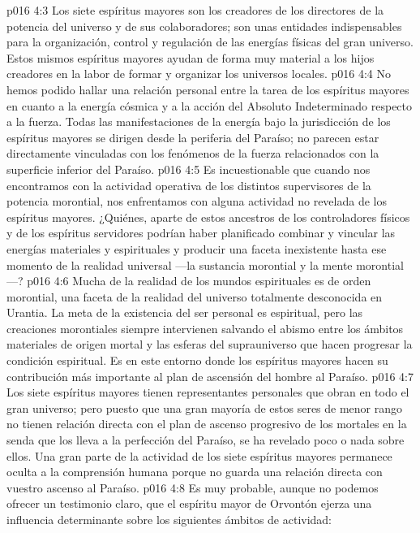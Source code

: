 \vs p016 4:3 Los siete espíritus mayores son los creadores de los directores de la potencia del universo y de sus colaboradores; son unas entidades indispensables para la organización, control y regulación de las energías físicas del gran universo. Estos mismos espíritus mayores ayudan de forma muy material a los hijos creadores en la labor de formar y organizar los universos locales.
\vs p016 4:4 No hemos podido hallar una relación personal entre la tarea de los espíritus mayores en cuanto a la energía cósmica y a la acción del Absoluto Indeterminado respecto a la fuerza. Todas las manifestaciones de la energía bajo la jurisdicción de los espíritus mayores se dirigen desde la periferia del Paraíso; no parecen estar directamente vinculadas con los fenómenos de la fuerza relacionados con la superficie inferior del Paraíso.
\vs p016 4:5 Es incuestionable que cuando nos encontramos con la actividad operativa de los distintos supervisores de la potencia morontial, nos enfrentamos con alguna actividad no revelada de los espíritus mayores. ¿Quiénes, aparte de estos ancestros de los controladores físicos y de los espíritus servidores podrían haber planificado combinar y vincular las energías materiales y espirituales y producir una faceta inexistente hasta ese momento de la realidad universal ---la sustancia morontial y la mente morontial---?
\vs p016 4:6 Mucha de la realidad de los mundos espirituales es de orden morontial, una faceta de la realidad del universo totalmente desconocida en Urantia. La meta de la existencia del ser personal es espiritual, pero las creaciones morontiales siempre intervienen salvando el abismo entre los ámbitos materiales de origen mortal y las esferas del suprauniverso que hacen progresar la condición espiritual. Es en este entorno donde los espíritus mayores hacen su contribución más importante al plan de ascensión del hombre al Paraíso.
\vs p016 4:7 Los siete espíritus mayores tienen representantes personales que obran en todo el gran universo; pero puesto que una gran mayoría de estos seres de menor rango no tienen relación directa con el plan de ascenso progresivo de los mortales en la senda que los lleva a la perfección del Paraíso, se ha revelado poco o nada sobre ellos. Una gran parte de la actividad de los siete espíritus mayores permanece oculta a la comprensión humana porque no guarda una relación directa con vuestro ascenso al Paraíso.
\vs p016 4:8 \pc Es muy probable, aunque no podemos ofrecer un testimonio claro, que el espíritu mayor de Orvontón ejerza una influencia determinante sobre los siguientes ámbitos de actividad:
